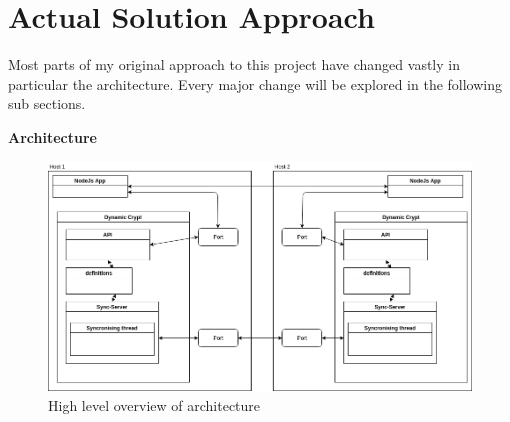 \section{Actual Solution Approach}
Most parts of my original approach to this project have changed vastly in particular the architecture. Every major change will be explored in the following sub sections.

\textbf{Architecture}

\begin{figure}[!h]
  \centering
      \includegraphics[width=1\textwidth]{Figures/basic-2hosts-final.png}
  \caption[High level overview of architecture]{High level overview of architecture}
  \label{fig:basic-two-hosts-final}
\end{figure}
\FloatBarrier

